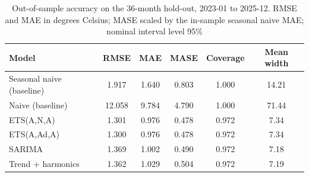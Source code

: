 \begin{table}[t]
\centering
\begin{threeparttable}
\caption{Out-of-sample accuracy on the 36-month hold-out, 2023-01 to 2025-12. RMSE and MAE in degrees Celsius; MASE scaled by the in-sample seasonal naive MAE; nominal interval level 95\%}
\label{tab:oos}
\begin{tabular}{lccccc}
\toprule
Model & RMSE & MAE & MASE & Coverage & Mean width \\
\midrule
Seasonal naive (baseline) & 1.917 & 1.640 & 0.803 & 1.000 & 14.21 \\
Naive (baseline) & 12.058 & 9.784 & 4.790 & 1.000 & 71.44 \\
ETS(A,N,A) & 1.301 & 0.976 & 0.478 & 0.972 & 7.34 \\
ETS(A,Ad,A) & 1.300 & 0.976 & 0.478 & 0.972 & 7.34 \\
SARIMA & 1.369 & 1.002 & 0.490 & 0.972 & 7.18 \\
Trend + harmonics & 1.362 & 1.029 & 0.504 & 0.972 & 7.19 \\
\bottomrule
\end{tabular}
\end{threeparttable}
\end{table}
